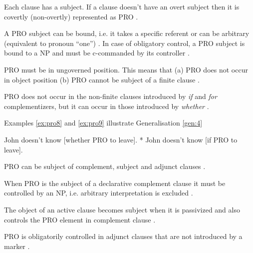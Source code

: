     \begin{generalization}\label{gen:1}
    	Each clause has a subject. If a clause doesn't have an overt subject then it is covertly (non-overtly) represented as PRO
         \citep[263]{Haegeman1991}.
    \end{generalization}
    \begin{generalization}\label{gen:2}
    	A PRO subject can be bound, i.e. it takes a specific referent or can be arbitrary (equivalent to pronoun ``one'') \citep[263]{Haegeman1991}. In case of obligatory control, a PRO subject is bound to a NP and must be c-commanded by its controller \citep[278]{Haegeman1991}.
    \end{generalization}

    \begin{generalization}\label{gen:3}
    	PRO must be in ungoverned position. This means that (a) PRO does not occur in object position (b) PRO cannot be subject of a finite clause \citep[279]{Haegeman1991}. 
    \end{generalization}
    \begin{generalization}\label{gen:4}
    	PRO does not occur in the non-finite clauses introduced by \textit{if} and \textit{for} complementizers, but it can occur in those introduced by \textit{whether} \citep[279]{Haegeman1991}.  
    \end{generalization}

    Examples \ref{ex:pro8} and \ref{ex:pro9} illustrate Generalisation \ref{gen:4}
    \begin{exe}
    	\ex\label{ex:pro8} John doesn't know [whether PRO to leave].
    	\ex\label{ex:pro9} * John doesn’t know [if PRO to leave].
    \end{exe}

    \begin{generalization}\label{gen:5}
    	PRO can be subject of complement, subject and adjunct clauses \citep[278]{Haegeman1991}.
    \end{generalization}
    \begin{generalization}\label{gen:6}
    	When PRO is the subject of a declarative complement clause it must be controlled by an NP, i.e. arbitrary interpretation is excluded \citep[280]{Haegeman1991}.
    \end{generalization}
    \begin{generalization}\label{gen:7}
    	The object of an active clause becomes subject when it is passivized and also controls the PRO element in complement clause \citep[281]{Haegeman1991}.
    \end{generalization}
    \begin{generalization}\label{gen:8}
    	PRO is obligatorily controlled in adjunct clauses that are not introduced by a marker \citep[283]{Haegeman1991}.
    \end{generalization}

